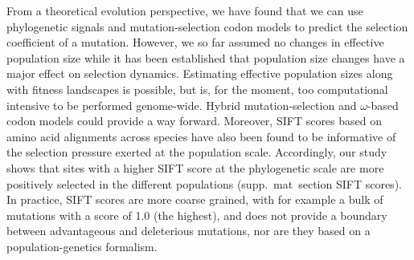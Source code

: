 \documentclass{article}
\begin{document}
    From a theoretical evolution perspective, we have found that we can use phylogenetic signals and mutation-selection codon models to predict the selection coefficient of a mutation.
    However, we so far assumed no changes in effective population size while it has been established that population size changes have a major effect on selection dynamics\cite{lanfear_population_2014, jones_shifting_2017, platt_protein_2018}.
    Estimating effective population sizes along with fitness landscapes is possible\cite{latrille_inferring_2021}, but is, for the moment, too computational intensive to be performed genome-wide\cite{latrille_inferring_2021}.
    Hybrid mutation-selection and $\omega$-based codon models could provide a way forward\cite{brevet_reconstructing_2021}.
    Moreover, SIFT scores based on amino acid alignments across species have also been found to be informative of the selection pressure exerted at the population scale\cite{chen_hunting_2021}.
    Accordingly, our study shows that sites with a higher SIFT score at the phylogenetic scale are more positively selected in the different populations (supp.\ mat\  section SIFT scores).
    In practice, SIFT scores are more coarse grained, with for example a bulk of mutations with a score of 1.0 (the highest), and does not provide a boundary between advantageous and deleterious mutations, nor are they based on a population-genetics formalism.
\end{document}

